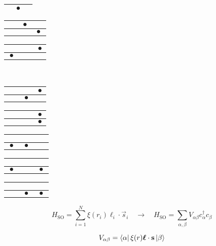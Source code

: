 \begin{frame}[t]
\begin{center}
\begin{tabular}{|c|c|c|}
  & $\bullet$ &  \\
  \hline
  \end{tabular}
  \begin{tabular}{|c|c|c|}
  \hline
  $\phantom{\bullet}$ & $\bullet$ & $\phantom{\bullet}$ \\ \hline
  &  & $\bullet$ \\
  \hline
  \end{tabular}
  \begin{tabular}{|c|c|c|}
  \hline
  $\phantom{\bullet}$ & $\phantom{\bullet}$ & $\bullet$ \\ \hline
  $\bullet$ &  &  \\
  \hline
  \end{tabular} \\
  \vspace{0.5em}
  \begin{tabular}{|c|c|c|}
  \hline
  $\phantom{\bullet}$ & $\phantom{\bullet}$ & $\bullet$ \\ \hline
  & $\bullet$ &  \\
  \hline
  \end{tabular}
  \begin{tabular}{|c|c|c|}
  \hline
  $\phantom{\bullet}$ & $\phantom{\bullet}$ & $\bullet$ \\ \hline
  &  & $\bullet$ \\
  \hline
  \end{tabular}
  \begin{tabular}{|c|c|c|}
  \hline
  $\phantom{\bullet}$ & $\phantom{\bullet}$ & $\phantom{\bullet}$ \\ \hline
  $\bullet$ & $\bullet$ &  \\
  \hline
  \end{tabular}
  \begin{tabular}{|c|c|c|}
  \hline
  $\phantom{\bullet}$ & $\phantom{\bullet}$ & $\phantom{\bullet}$ \\ \hline
  $\bullet$ &  & $\bullet$ \\
  \hline
  \end{tabular}
  \begin{tabular}{|c|c|c|}
  \hline
  $\phantom{\bullet}$ & $\phantom{\bullet}$ & $\phantom{\bullet}$ \\ \hline
  & $\bullet$ & $\bullet$ \\
  \hline
  \end{tabular}
  \end{center}
  \[ H_\text{SO} = \sum_{i=1}^N \xi(r_i) \boldsymbol{\ell}_i\cdot\vec{s}_i
  \quad \longrightarrow \quad
  H_\text{SO} = \sum_{\alpha,\beta} V_{\alpha\beta} c_\alpha^\dagger c_\beta \]
  
  \[ V_{\alpha\beta} = \Bra{\alpha} \xi(r) \boldsymbol{\ell}\cdot\vec{s} \Ket{\beta} \]
\end{frame}

